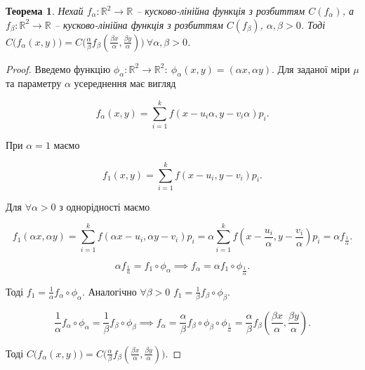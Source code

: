 \documentclass[12pt]{article}
\newtheorem{theorem}{Теорема}
\begin{document}
\begin{theorem}
	Нехай $f_\alpha:\mathbb{R}^2\rightarrow \mathbb{R}$ – кусково-лінійна функція з розбиттям $C(f_\alpha)$, а $f_\beta:\mathbb{R}^2\rightarrow \mathbb{R}$ – кусково-лінійна функція з розбиттям $C(f_\beta)$, $\alpha, \beta>0$. Тоді $C\big(f_\alpha(x,y)\big)= C\big(\frac{\alpha}{\beta}f_\beta(\frac{\beta x}{\alpha}, \frac{\beta y}{\alpha})\big) \ \forall \alpha, \beta>0$.
\end{theorem}

\begin{proof}
	
	
	Введемо функцію $\phi_\alpha:\mathbb{R}^2\rightarrow\mathbb{R}^2:\ \phi_\alpha(x,y)=(\alpha x,\alpha y)$. Для заданої міри $\mu$ та параметру $\alpha$ усереднення має вигляд
	
	\begin{equation} 
		f_\alpha(x,y)=\sum_{i=1}^{k}f(x-u_{i}\alpha, y-v_{i}\alpha)p_{i}.
	\end{equation}
	
	При $\alpha=1$ маємо
	
	\begin{equation} 
		f_1(x,y)=\sum_{i=1}^{k}f(x-u_{i}, y-v_{i})p_i.
	\end{equation}
	
	Для $\forall \alpha>0$ з однорідності маємо
	
	\begin{equation} 
		f_1(\alpha x,\alpha y)=\sum_{i=1}^{k}f(\alpha x-u_{i}, \alpha y-v_{i})p_i=\alpha \sum_{i=1}^{k}f(x-\frac{u_{i}}{\alpha}, y-\frac{v_{i}}{\alpha})p_i=\alpha f_{\frac{1}{\alpha}}.
	\end{equation}
	
	\begin{equation} 
		\alpha f_{\frac{1}{\alpha}}=f_1 \circ \phi_{\alpha} \implies f_{\alpha}=\alpha f_1 \circ \phi_{\frac{1}{\alpha}}.
	\end{equation}
	
	
	Тоді $f_1=\frac{1}{\alpha}f_\alpha \circ \phi_\alpha$. Аналогічно $\forall \beta>0$ $f_1=\frac{1}{\beta}f_\beta \circ \phi_\beta$.
	
	\begin{equation} 
		\frac{1}{\alpha}f_\alpha \circ \phi_\alpha=\frac{1}{\beta}f_\beta \circ \phi_\beta \implies f_\alpha=\frac{\alpha}{\beta}f_\beta \circ \phi_\beta \circ \phi_\frac{1}{\alpha}=\frac{\alpha}{\beta} f_\beta(\frac{\beta x}{\alpha},\frac{\beta y}{\alpha}).
	\end{equation}
	
	Тоді $C\big(f_\alpha(x,y)\big)=C\big(\frac{\alpha}{\beta} f_\beta(\frac{\beta x}{\alpha},\frac{\beta y}{\alpha})\big).$
	
\end{proof}
\end{document}
